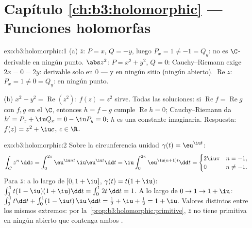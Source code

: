 \section*{Capítulo \ref{ch:b3:holomorphic} --- Funciones
holomorfas}

\begin{solution}{exo:b3:holomorphic:1}
(a) $\bar z$: $P = x$, $Q = -y$, luego $P_x = 1 \neq -1 = Q_y$: no es
$\C$-derivable en ningún punto. $\abs z^2$: $P = x^2 + y^2$, $Q =
0$: Cauchy--Riemann exige $2x = 0 = 2y$: derivable solo en $0$ --- y
 en ningún sitio (ningún
abierto). $\operatorname{Re}z$:
$P_x = 1 \neq 0 = Q_y$: en ningún punto.

(b) $x^2 - y^2 = \operatorname{Re}(z^2)$: $f(z) = z^2$ sirve. Todas las
soluciones: si $\operatorname{Re}f = \operatorname{Re}g$ con $f, g$
 en el
 $\C$, entonces $h = f -
g$ cumple $\operatorname{Re}h = 0$; Cauchy--Riemann da $h' =
P_x + \iu Q_x = 0 - \iu P_y = 0$: $h$ es una constante imaginaria.
Respuesta: $f(z) = z^2 + \iu c$, $c \in \R$.
\end{solution}

\begin{solution}{exo:b3:holomorphic:2}
Sobre la circunferencia unidad $\gamma(t) = \eu^{\iu t}$:
\[
\int_C z^n\,\dd z = \int_0^{2\pi}\eu^{\iu nt}\,\iu\eu^{\iu
t}\dd t = \iu\int_0^{2\pi}\eu^{\iu(n+1)t}\dd t
= \begin{cases} 2\iu\pi & n = -1,\\ 0 & n \neq -1.\end{cases}
\]
Para $\bar z$: a lo largo de $[0, 1+\iu]$, $\gamma(t) = t(1 + \iu)$:
$\int_0^1 t(1 - \iu)(1 + \iu)\dd t = \int_0^12t\,\dd t = 1$.
A lo largo de $0 \to 1 \to 1 + \iu$: $\int_0^1t\dd t +
\int_0^1(1 - \iu t)\,\iu\,\dd t = \frac12 + \iu + \frac12 = 1
+ \iu$. Valores distintos entre los mismos extremos: por
la~\cref{prop:b3:holomorphic:primitive}, $\bar z$ no tiene primitiva en
ningún abierto que contenga ambos
.
\end{solution}

